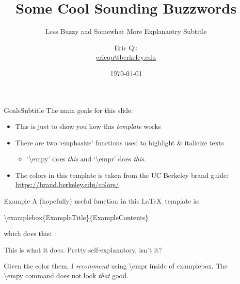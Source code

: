 \documentclass[pdf,serif]{beamer}
\title[Buzz Words, maybe Clever Abbreviations]{Some Cool Sounding Buzzwords}
\subtitle{Less Buzzy and Somewhat More Explanaotry Subtitle}
\newcommand{\empy}[1]{{\color{CaliforniaGold}\emph{#1}}}
\newcommand{\empr}[1]{{\color{BerkeleyBlue}\emph{#1}}}
\newcommand{\examplebox}[2]{
\begin{tcolorbox}[colframe=CaliforniaGold,colback=boxgray,title=#1]
#2
\end{tcolorbox}}
\begin{document}
\author[Eric Qu, UC Berkeley]{
	\begin{tabular}{c} 
	\Large
	Eric Qu\\
    \footnotesize \href{mailto:ericqu@berkeley.edu}{ericqu@berkeley.edu}
\end{tabular}
\vspace{-3ex}}

\date{\today}

\begin{noheadline}
\begin{frame}\maketitle\end{frame}
\end{noheadline}



\begin{frame}{Goals}{Subtitle}
The main goals for this slide:
\begin{itemize}
	\item This is just to show you how this \empy{template} works
	\item There are two `emphasize' functions used to highlight \& italicize texts
	\begin{itemize}
		\item `\textbackslash empy' does \empy{this} and `\textbackslash empr' does \empr{this}.
	\end{itemize}
	\item The colors in this template is taken from the UC Berkeley brand guide: {\url{https://brand.berkeley.edu/colors/}}
\end{itemize}
\end{frame}



\begin{frame}{Example}
A (hopefully) useful function in this \LaTeX~template is:
\begin{center}
	\textbackslash examplebox\{ExampleTitle\}\{ExampleContents\}
\end{center}
which does this:
\examplebox{Example of the Command \textbackslash examplebox}{
This is what it does. Pretty self-explanatory, isn't it?

Given the color them, I \empr{recommend} using \textbackslash empr inside of examplebox. The \textbackslash empy command does not look \empy{that} good.
}
\end{frame}
\end{document}
